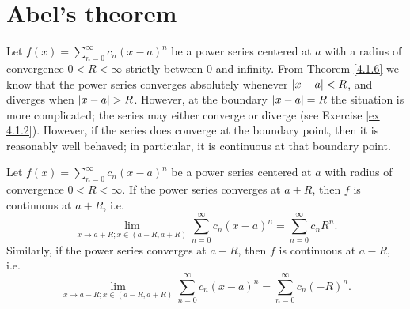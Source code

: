 \section{Abel's theorem}\label{sec 4.3}

\begin{note}
    Let \(f(x) = \sum_{n = 0}^\infty c_n (x - a)^n\) be a power series centered at \(a\) with a radius of convergence \(0 < R < \infty\) strictly between \(0\) and infinity.
    From Theorem \ref{4.1.6} we know that the power series converges absolutely whenever \(\abs*{x - a} < R\), and diverges when \(\abs*{x - a} > R\).
    However, at the boundary \(\abs*{x - a} = R\) the situation is more complicated;
    the series may either converge or diverge (see Exercise \ref{ex 4.1.2}).
    However, if the series does converge at the boundary point, then it is reasonably well behaved;
    in particular, it is continuous at that boundary point.
\end{note}

\begin{theorem}\label{4.3.1}
    Let \(f(x) = \sum_{n = 0}^\infty c_n (x - a)^n\) be a power series centered at \(a\) with radius of convergence \(0 < R < \infty\).
    If the power series converges at \(a + R\), then \(f\) is continuous at \(a + R\), i.e.
    \[
        \lim_{x \to a + R ; x \in (a - R, a + R)} \sum_{n = 0}^\infty c_n (x - a)^n = \sum_{n = 0}^\infty c_n R^n.
    \]
    Similarly, if the power series converges at \(a - R\), then \(f\) is continuous at \(a - R\), i.e.
    \[
        \lim_{x \to a - R ; x \in (a - R, a + R)} \sum_{n = 0}^\infty c_n (x - a)^n = \sum_{n = 0}^\infty c_n (-R)^n.
    \]
\end{theorem}


